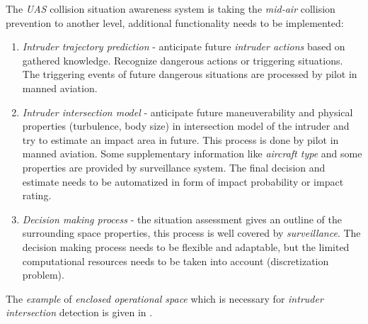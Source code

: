 The \emph{UAS} collision situation awareness system is taking the \emph{mid-air} collision prevention to another level, additional functionality needs to be implemented:

\begin{enumerate}
    \item \emph{Intruder trajectory prediction} - anticipate future \emph{intruder actions} based on gathered knowledge. Recognize dangerous actions or triggering situations. The triggering events of future dangerous situations are processed by pilot in manned aviation.
    
    \item \emph{Intruder intersection model} - anticipate future maneuverability and physical properties (turbulence, body size) in intersection model of the intruder and try to estimate an impact area in future. This process is done by pilot in manned aviation. Some supplementary information like \emph{aircraft type} and some properties are provided by surveillance system. The final decision and estimate needs to be automatized in form of impact probability or impact rating. 
    
    \item \emph{Decision making process} - the situation assessment gives an outline of the surrounding space properties, this process is well covered by \emph{surveillance}. The decision making process needs to be flexible and adaptable, but the limited computational resources needs to be taken into account (discretization problem).
\end{enumerate}

\begin{note}
    The \emph{example} of \emph{enclosed operational space} which is necessary for \emph{intruder intersection} detection is given in \cite{welzl1991smallest}.
\end{note}